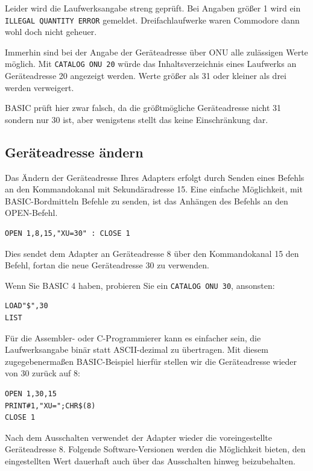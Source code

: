 \documentclass[10pt,a4paper]{scrartcl}		%
\begin{document}
Leider wird die Laufwerksangabe streng geprüft. Bei Angaben größer 1
wird ein \texttt{ILLEGAL QUANTITY ERROR} gemeldet. Dreifachlaufwerke
waren Commodore dann wohl doch nicht geheuer.

Immerhin sind bei der Angabe der Geräteadresse über ONU alle
zulässigen Werte möglich. Mit \texttt{CATALOG ONU 20} würde das
Inhaltsverzeichnis eines Laufwerks an Geräteadresse 20 angezeigt werden.
Werte größer als 31 oder kleiner als drei werden verweigert. 

BASIC prüft hier zwar falsch, da die größtmögliche Geräteadresse nicht 31
sondern nur 30 ist, aber wenigstens stellt das keine Einschränkung dar.

\subsection{Geräteadresse ändern}
Das Ändern der Geräteadresse Ihres Adapters erfolgt durch Senden
eines Befehls an den Kommandokanal mit Sekundäradresse 15. Eine einfache
Möglichkeit, mit BASIC-Bordmitteln Befehle zu senden, ist das Anhängen
des Befehls an den OPEN-Befehl.

\begin{verbatim}
OPEN 1,8,15,"XU=30" : CLOSE 1
\end{verbatim}

Dies sendet dem Adapter an Geräteadresse 8 über den Kommandokanal 15
den Befehl, fortan die neue Geräteadresse 30 zu verwenden.

Wenn Sie BASIC 4 haben, probieren Sie ein \texttt{CATALOG ONU 30}, ansonsten:
\begin{verbatim}
LOAD"$",30
LIST
\end{verbatim}

Für die Assembler- oder C-Programmierer kann es einfacher sein,
die Laufwerksangabe binär statt ASCII-dezimal zu übertragen. Mit diesem
zugegebenermaßen BASIC-Beispiel hierfür stellen wir die Geräteadresse
wieder von 30 zurück auf 8:

\begin{verbatim}
OPEN 1,30,15
PRINT#1,"XU=";CHR$(8)
CLOSE 1
\end{verbatim}

Nach dem Ausschalten verwendet der Adapter wieder die voreingestellte
Geräteadresse 8. Folgende Software-Versionen werden die Möglichkeit 
bieten, den eingestellten Wert dauerhaft auch über das Ausschalten hinweg
beizubehalten.

\clearpage %
\end{document}
